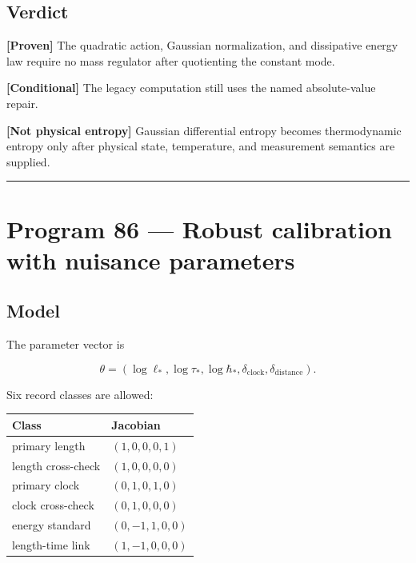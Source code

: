 \documentclass[11pt,a4paper,openany]{report}
\newcommand{\statusProven}{\textcolor{fingreen}{[Proven]}}
\newcommand{\statusConditional}{\textcolor{finorange}{[Conditional]}}
\begin{document}
\section{Verdict}

\textbf{\statusProven{}} The quadratic action, Gaussian normalization, and dissipative energy law require no mass regulator after quotienting the constant mode.

\textbf{\statusConditional{}} The legacy computation still uses the named absolute-value repair.

\textbf{[Not physical entropy]} Gaussian differential entropy becomes thermodynamic entropy only after physical state, temperature, and measurement semantics are supplied.

\par\medskip\hrule\medskip

\chapter{Program 86 --- Robust calibration with nuisance parameters}

\section{Model}

The parameter vector is

\[
\theta
=
(
\log\ell_*,
\log\tau_*,
\log\hbar_*,
\delta_{\mathrm{clock}},
\delta_{\mathrm{distance}}
).
\]

Six record classes are allowed:

\begin{center}
\begingroup\small
\setlength{\tabcolsep}{3.5pt}
\renewcommand{\arraystretch}{1.16}
\begin{longtable}{@{}p{}p{}@{}}
\toprule
\textbf{Class} & \textbf{Jacobian} \\
\midrule
\endhead
primary length & \((1,0,0,0,1)\) \\
length cross-check & \((1,0,0,0,0)\) \\
primary clock & \((0,1,0,1,0)\) \\
clock cross-check & \((0,1,0,0,0)\) \\
energy standard & \((0,-1,1,0,0)\) \\
length-time link & \((1,-1,0,0,0)\) \\
\bottomrule
\end{longtable}
\endgroup
\end{center}
\end{document}
